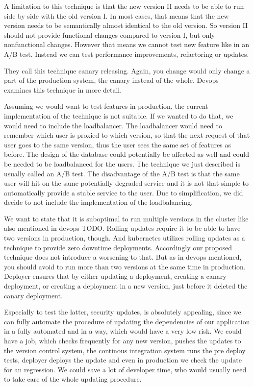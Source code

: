 A limitation to this technique is that the new version II needs to be able to run side by
side with the old version I. In most cases, that means that the new version needs to be
semantically almost identical to the old version. So version II should not provide
functional changes compared to version I, but only nonfunctional changes. However that
means we cannot test new feature like in an A/B test. Instead we can test performance
improvements, refactoring or updates.

They call this technique canary releasing. Again, you change would only change a part of
the production system, the canary instead of the whole. Devops~\cite{cd_humble_deploy}
examines this technique in more detail.

Assuming we would want to test features in production, the current implementation of the
technique is not suitable. If we wanted to do that, we would need to include the
loadbalancer. The loadbalancer would need to remember which user is proxied to which
version, so that the next request of that user goes to the same version, thus the user
sees the same set of features as before. The design of the database could potentially be
affected as well and could be needed to be loadbalanced for the users. The technique we
just described is usually called an A/B test. The disadvantage of the A/B test is that the
same user will hit on the same potentially degraded service and it is not that simple to
automatically provide a stable service to the user. Due to simplification, we did decide
to not include the implementation of the loadbalancing.

We want to state that it is suboptimal to run multiple versions in the cluster like also
mentioned in devops TODO. Rolling updates require it to be able to have two versions in
production, though. And kubernetes utilizes rolling updates as a technique to provide zero
downtime deployments. Accordingly our proposed technique does not introduce a worsening to
that. But as in devops mentioned, you should avoid to run more than two versions at the
same time in production. Deployer ensures that by either updating a deployment, creating a
canary deployment, or creating a deployment in a new version, just before it deleted the
canary deployment.

Especially to test the latter, security updates, is absolutely appealing, since we can
fully automate the procedure of updating the dependencies of our application in a fully
automated and in a way, which would have a very low risk. We could have a job, which
checks frequently for any new version, pushes the updates to the version control system,
the continous integration system runs the pre deploy tests, deployer deploys the update
and even in production we check the update for an regression. We could save a lot of
developer time, who would usually need to take care of the whole updating procedure.

